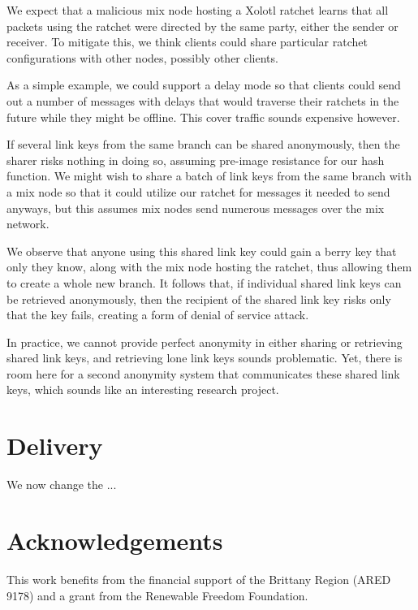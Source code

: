 \documentclass[twoside,letterpaper]{llncs}
\begin{document}
We expect that a malicious mix node hosting a Xolotl ratchet learns
that all packets using the ratchet were directed by the same party,
either the sender or receiver.  To mitigate this, we think clients
could share particular ratchet configurations with other nodes,
possibly other clients.  

As a simple example, we could support a delay mode so that clients
could send out a number of messages with delays that would traverse
their ratchets in the future while they might be offline. 
This cover traffic sounds expensive however.

If several link keys from the same branch can be shared anonymously,
then the sharer risks nothing in doing so, assuming pre-image
resistance for our hash function.  We might wish to share a batch
of link keys from the same branch with a mix node so that it could
utilize our ratchet for messages it needed to send anyways, but this
assumes mix nodes send numerous messages  over the mix network.

We observe that anyone using this shared link key could gain a berry
key that only they know, along with the mix node hosting the ratchet,
thus allowing them to create a whole new branch.  It follows that,
if individual shared link keys can be retrieved anonymously, then
the recipient of the shared link key risks only that the key fails,
creating a form of denial of service attack.

In practice, we cannot provide perfect anonymity in either sharing
or retrieving shared link keys, and retrieving lone link keys sounds
problematic.  Yet, there is room here for a second anonymity system
that communicates these shared link keys, which sounds like an
interesting research project.


\section{Delivery}

We now change the ...


\section*{Acknowledgements}
This work benefits from the financial support of the Brittany Region
(ARED 9178) and a grant from the Renewable Freedom Foundation.





\end{document}
